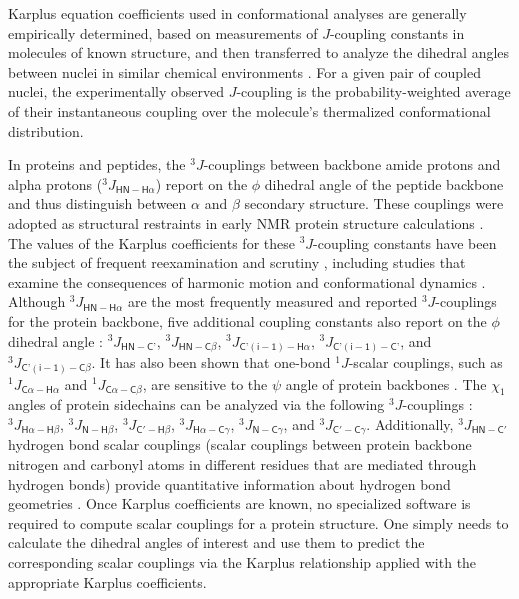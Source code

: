 \documentclass[9pt,review]{livecoms}
\begin{document}
Karplus equation coefficients used in conformational analyses are generally empirically determined, based on measurements of $J$-coupling constants in molecules of known structure, and then transferred to analyze the dihedral angles between nuclei in similar chemical environments \cite{karplus_contact_1959,karplus_vicinal_1963,haasnoot_relationship_1980,wang_determination_1996,vogeli_limits_2007}.
For a given pair of coupled nuclei, the experimentally observed $J$-coupling is the probability-weighted average of their instantaneous coupling over the molecule’s thermalized conformational distribution.

In proteins and peptides, the $^3J$-couplings between backbone amide protons and alpha protons ($^3J_{\mathsf{HN-H\alpha}}$) report on the $\phi$ dihedral angle of the peptide backbone and thus distinguish between $\alpha$ and $\beta$ secondary structure.
These couplings were adopted as structural restraints in early NMR protein structure calculations \cite{pardi_calibration_1984}.
The values of the Karplus coefficients for these $^3J$-coupling constants have been the subject of frequent reexamination and scrutiny \cite{case_static_2000,lindorff-larsen_interpreting_2005,altona_vicinal_2007,vogeli_limits_2007,wang_quantum_2013,lee_quantitative_2015,li_high_2015}, including studies that examine the consequences of harmonic motion and conformational dynamics \cite{brueschweiler_adding_1994,case_static_2000,lindorff-larsen_interpreting_2005,vogeli_limits_2007,lee_quantitative_2015}.
Although $^3J_{\mathsf{HN-H\alpha}}$ are the most frequently measured and reported $^3J$-couplings for the protein backbone, five additional coupling constants also report on the $\phi$ dihedral angle \cite{schmidt_self-consistent_1999}: $^3J_{\mathsf{HN-C’}}$, $^3J_{\mathsf{HN-C\beta}}$, $^3J_{\mathsf{C’(i-1)-H\alpha}}$, $^3J_{\mathsf{C’(i-1)-C’}}$, and $^3J_{\mathsf{C’(i-1)-C\beta}}$.
It has also been shown that one-bond $^1J$-scalar couplings, such as $^1J_{\mathsf{C\alpha-H\alpha}}$ and $^1J_{\mathsf{C\alpha-C\beta}}$, are sensitive to the $\psi$ angle of protein backbones \cite{vuister_use_1993,cornilescu_large_2000,gapsys_improved_2015}.
The $\chi_1$ angles of protein sidechains can be analyzed via the following $^3J$-couplings \cite{perez_self-consistent_2001,chou_insights_2003}: $^3J_{\mathsf{H\alpha-H\beta}}$, $^3J_{\mathsf{N-H\beta}}$, $^3J_{\mathsf{C'-H\beta}}$, $^3J_{\mathsf{H\alpha-C\gamma}}$, $^3J_{\mathsf{N-C\gamma}}$, and $^3J_{\mathsf{C'-C\gamma}}$.
Additionally, $^3J_{\mathsf{HN-C'}}$ hydrogen bond scalar couplings (scalar couplings between protein backbone nitrogen and carbonyl atoms in different residues that are mediated through hydrogen bonds) provide quantitative information about hydrogen bond geometries \cite{barfield_structural_2002}.
Once Karplus coefficients are known, no specialized software is required to compute scalar couplings for a protein structure.
One simply needs to calculate the dihedral angles of interest and use them to predict the corresponding scalar couplings via the Karplus relationship applied with the appropriate Karplus coefficients.
\end{document}
